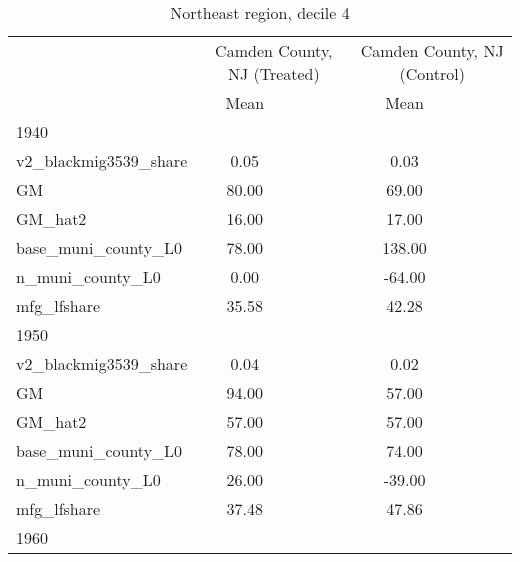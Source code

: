 \begin{table}[htbp]\centering
\def\sym#1{\ifmmode^{#1}\else\(^{#1}\)\fi}
\caption{Northeast region, decile 4 \label{tab1}}
\begin{tabular}{l*{2}{ccc}}
\toprule
                    &\multicolumn{3}{c}{Camden County, NJ (Treated)}&\multicolumn{3}{c}{Camden County, NJ (Control)}\\
                    &        Mean&            &            &        Mean&            &            \\
\midrule
1940                &            &            &            &            &            &            \\
v2\_blackmig3539\_share&        0.05&            &            &        0.03&            &            \\
GM                  &       80.00&            &            &       69.00&            &            \\
GM\_hat2             &       16.00&            &            &       17.00&            &            \\
base\_muni\_county\_L0 &       78.00&            &            &      138.00&            &            \\
n\_muni\_county\_L0    &        0.00&            &            &      -64.00&            &            \\
mfg\_lfshare         &       35.58&            &            &       42.28&            &            \\
\midrule
1950                &            &            &            &            &            &            \\
v2\_blackmig3539\_share&        0.04&            &            &        0.02&            &            \\
GM                  &       94.00&            &            &       57.00&            &            \\
GM\_hat2             &       57.00&            &            &       57.00&            &            \\
base\_muni\_county\_L0 &       78.00&            &            &       74.00&            &            \\
n\_muni\_county\_L0    &       26.00&            &            &      -39.00&            &            \\
mfg\_lfshare         &       37.48&            &            &       47.86&            &            \\
\midrule
1960                &            &            &            &            &            &            \\

\end{tabular}
\end{table}
